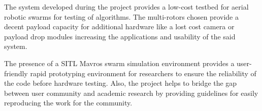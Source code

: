 \begin{spacing}{2}
The system developed during the project provides a low-cost testbed for aerial robotic swarms for testing of algorithms. The multi-rotors chosen provide a decent payload capacity for additional hardware like a lost cost camera or payload drop modules increasing the applications and usability of the said system.

The presence of a SITL Mavros swarm simulation environment provides a user-friendly rapid prototyping environment for researchers to ensure the reliability of the code before hardware testing. Also, the project helps to bridge the gap between user community and academic research by providing guidelines for easily reproducing the work for the community.
\end{spacing}